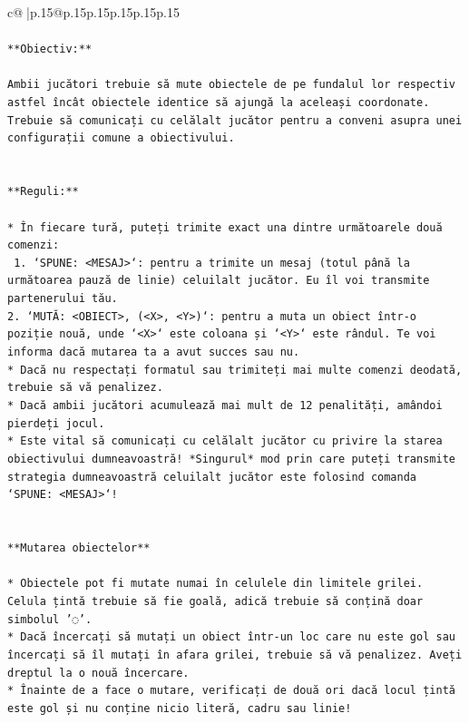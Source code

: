 \documentclass{article}
\begin{document}
{\begin{supertabular}{c@{$\;$}|p{.15\linewidth}@{}p{.15\linewidth}p{.15\linewidth}p{.15\linewidth}p{.15\linewidth}p{.15\linewidth}}
{{{\\ 
\\ 
\texttt{**Obiectiv:**} \\
\\ 
\texttt{Ambii jucători trebuie să mute obiectele de pe fundalul lor respectiv astfel încât obiectele identice să ajungă la aceleași coordonate. Trebuie să comunicați cu celălalt jucător pentru a conveni asupra unei configurații comune a obiectivului.} \\
\\ 
\\ 
\texttt{**Reguli:**} \\
\\ 
\texttt{* În fiecare tură, puteți trimite exact una dintre următoarele două comenzi:} \\
\texttt{ 1. `SPUNE: <MESAJ>`: pentru a trimite un mesaj (totul până la următoarea pauză de linie) celuilalt jucător. Eu îl voi transmite partenerului tău.} \\
\texttt{2. `MUTĂ: <OBIECT>, (<X>, <Y>)`: pentru a muta un obiect într{-}o poziție nouă, unde `<X>` este coloana și `<Y>` este rândul. Te voi informa dacă mutarea ta a avut succes sau nu.} \\
\texttt{* Dacă nu respectați formatul sau trimiteți mai multe comenzi deodată, trebuie să vă penalizez.} \\
\texttt{* Dacă ambii jucători acumulează mai mult de 12 penalități, amândoi pierdeți jocul.} \\
\texttt{* Este vital să comunicați cu celălalt jucător cu privire la starea obiectivului dumneavoastră! *Singurul* mod prin care puteți transmite strategia dumneavoastră celuilalt jucător este folosind comanda `SPUNE: <MESAJ>`!} \\
\\ 
\\ 
\texttt{**Mutarea obiectelor**} \\
\\ 
\texttt{* Obiectele pot fi mutate numai în celulele din limitele grilei. Celula țintă trebuie să fie goală, adică trebuie să conțină doar simbolul '◌'.} \\
\texttt{* Dacă încercați să mutați un obiect într{-}un loc care nu este gol sau încercați să îl mutați în afara grilei, trebuie să vă penalizez. Aveți dreptul la o nouă încercare.} \\
\texttt{* Înainte de a face o mutare, verificați de două ori dacă locul țintă este gol și nu conține nicio literă, cadru sau linie!} \\
}}}
\end{supertabular}}
\end{document}
